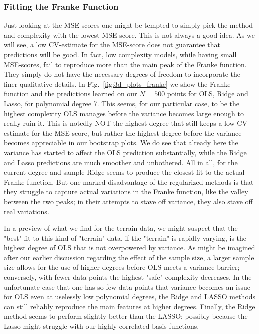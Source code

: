 \documentclass[reprint, english, nofootinbib]{revtex4-2}
\begin{document}
\subsubsection{Fitting the Franke Function}
\noindent
Just looking at the MSE-scores one might be tempted to simply pick the method and complexity with the lowest MSE-score. This is not always a good idea. As we will see, a low CV-estimate for the MSE-score does not guarantee that predictions will be good. In fact, low complexity models, while having small MSE-scores, fail to reproduce more than the main peak of the Franke function. They simply do not have the necessary degrees of freedom to incorporate the finer qualitative details. In Fig.~\ref{fig:3d_plots_franke} we show the Franke function and the predictions learned on our $N=500$ points for OLS, Ridge and Lasso, for polynomial degree 7. This seems, for our particular case, to be the highest complexity OLS manages before the variance becomes large enough to really ruin it. This is notedly NOT the highest degree that still keeps a low CV-estimate for the MSE-score, but rather the highest degree before the variance becomes appreciable in our bootstrap plots. We do see that already here the variance has started to affect the OLS prediction substantially, while the Ridge and Lasso predictions are much smoother and unbothered. All in all, for the current degree and sample Ridge seems to produce the closest fit to the actual Franke function. But one marked disadvantage of the regularized methods is that they struggle to capture actual variations in the Franke function, like the valley between the two peaks; in their attempts to stave off variance, they also stave off real variations.

In a preview of what we find for the terrain data, we might suspect that the "best" fit to this kind of "terrain" data, if the "terrain" is rapidly varying, is the highest degree of OLS that is not overpowered by variance. As might be imagined after our earlier discussion regarding the effect of the sample size, a larger sample size allows for the use of higher degrees before OLS meets a variance barrier; conversely, with fewer data points the highest "safe" complexity decreases. In the unfortunate case that one has so few data-points that variance becomes an issue for OLS even at uselessly low polynomial degrees, the Ridge and LASSO methods can still reliably reproduce the main features at higher degrees. Finally, the Ridge method seems to perform slightly better than the LASSO; possibly because the Lasso might struggle with our highly correlated basis functions.
\end{document}
